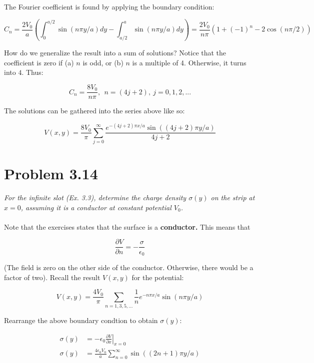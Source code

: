 \documentclass[10pt]{article}
\begin{document}
The Fourier coefficient is found by applying the boundary condition:

\begin{equation}
C_n = \frac{2V_0}{a} \left( \int_0^{a/2} \sin(n\pi y/a) dy - \int_{a/2}^{a} \sin(n\pi y/a) dy\right) = \frac{2 V_0}{n\pi}(1+(-1)^n - 2\cos(n\pi/2))
\end{equation}

How do we generalize the result into a sum of solutions?  Notice that the coefficient is zero if (a) $n$ is odd, or (b) $n$ is a multiple of 4.  Otherwise, it turns into $4$.  Thus:

\begin{equation}
C_n = \frac{8V_0}{n\pi}, ~~ n = (4j+2), ~ j = 0,1,2, ...
\end{equation}

The solutions can be gathered into the series above like so:

\begin{equation}
V(x,y) = \frac{8V_0}{\pi}\sum_{j=0}^{\infty} \frac{e^{-(4j+2)\pi x / a} \sin((4j+2) \pi y/a)}{4j+2}
\end{equation}

\section{Problem 3.14}

\textit{For the infinite slot (Ex. 3.3), determine the charge density $\sigma(y)$ on the strip at $x=0$, assuming it is a conductor at constant potential $V_0$.} \\ \\

Note that the exercises states that the surface is a \textbf{conductor.}  This means that

\begin{equation}
\frac{\partial V}{\partial n} = -\frac{\sigma}{\epsilon_0}
\end{equation}

(The field is zero on the other side of the conductor.  Otherwise, there would be a factor of two).  Recall the result $V(x,y)$ for the potential:

\begin{equation}
V(x,y) = \frac{4V_0}{\pi} \sum_{n = 1,3,5, ...} \frac{1}{n}e^{-n\pi x/a}\sin(n\pi y/a)
\end{equation}

Rearrange the above boundary condtion to obtain $\sigma(y)$:

\begin{align}
\sigma(y) &= -\epsilon_0 \left.\frac{\partial V}{\partial x}\right|_{x=0} \\
\sigma(y) &= \frac{4\epsilon_0 V_0}{a}\sum_{n=0}^{\infty} \sin((2n+1)\pi y/a)
\end{align}
\end{document}
